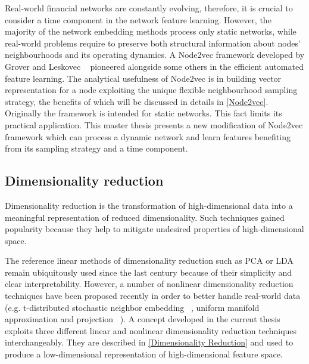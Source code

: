 Real-world financial networks are constantly evolving, therefore, it is crucial to consider a time component in the network feature learning. However, the majority of the network embedding methods process only static networks, while real-world problems require to preserve both structural information about nodes' neighbourhoods and its operating dynamics. A Node2vec framework developed by Grover and Leskovec ~\cite{node2vec} pioneered alongside some others in the efficient automated feature learning. The analytical usefulness of Node2vec is in building vector representation for a node exploiting the unique flexible neighbourhood sampling strategy, the benefits of which will be discussed in details in \ref{Node2vec}. Originally the framework is intended for static networks. This fact limits its practical application. This master thesis presents a new modification of Node2vec framework which can process a dynamic network and learn features benefiting from its sampling strategy and a time component.

\subsection{Dimensionality reduction}
Dimensionality reduction is the transformation of high-dimensional data into a meaningful representation of reduced dimensionality. Such techniques gained popularity because they help to mitigate undesired properties of high-dimensional space.

The reference linear methods of dimensionality reduction such as PCA or LDA remain ubiquitously used since the last century because of their simplicity and clear interpretability. However, a number of nonlinear dimensionality reduction techniques have been proposed recently in order to better handle real-world data (e.g. t-distributed stochastic neighbor embedding ~\cite{maaten2008visualizing}, uniform manifold approximation and projection ~\cite{mcinnes2018umap}). A concept developed in the current thesis exploits three different linear and nonlinear dimensionality reduction techniques interchangeably. They are described in \ref{Dimensionality Reduction} and used to produce a low-dimensional representation of high-dimensional feature space.

